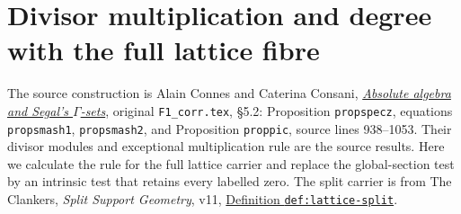\section{Divisor multiplication and degree with the full lattice fibre}
\label{sec:full-lattice-divisors}

The source construction is Alain Connes and Caterina Consani,
\href{https://arxiv.org/abs/1502.05585v2}{\emph{Absolute algebra and
Segal's $\Gamma$-sets}}, original \nolinkurl{F1_corr.tex},
\S5.2: Proposition \texttt{propspecz}, equations \texttt{propsmash1},
\texttt{propsmash2}, and Proposition \texttt{proppic}, source lines
938--1053. Their divisor modules and exceptional multiplication rule
are the source results. Here we calculate the rule for the full
lattice carrier and replace the global-section test by an intrinsic
test that retains every labelled zero. The split carrier is from
The Clankers, \emph{Split Support Geometry}, v11,
\href{https://github.com/KokunoYumeto/zeta-function-research-reader/blob/a2851f9eb352e7e4376bc629de86fa4ed9c1c434/workbenches/splitzero-tandem/foundations/split-support-geometry-v11/split_support_geometry_arithmetic_curve_v11.tex#L1226}{Definition \texttt{def:lattice-split}}.

